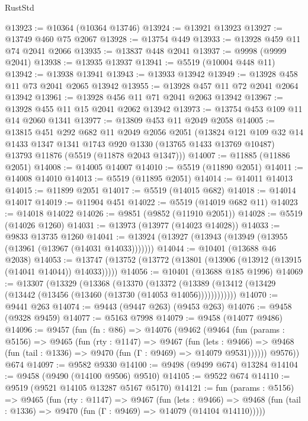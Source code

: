 \begin{lexlean}{RustStd}
\begin{coremodule}
@13923 := @10364 (@10364 @13746)
@13924 := @13921 @13923
@13927 := @13749 @460 @75 @2067
@13928 := @13754 @449
@13933 := @13928 @459 @11 @74 @2041 @2066
@13935 := @13837 @448 @2041
@13937 := @9998 (@9999 @2041)
@13938 := @13935 @13937
@13941 := @5519 (@10004 @448 @11)
@13942 := @13938 @13941
@13943 := @13933 @13942
@13949 := @13928 @458 @11 @73 @2041 @2065 @13942
@13955 := @13928 @457 @11 @72 @2041 @2064 @13942
@13961 := @13928 @456 @11 @71 @2041 @2063 @13942
@13967 := @13928 @455 @11 @15 @2041 @2062 @13942
@13973 := @13754 @453 @109 @11 @14 @2060 @1341
@13977 := @13809 @453 @11 @2049 @2058
@14005 := @13815
    @451
    @292
    @682
    @11
    @2049
    @2056
    @2051
    (@13824
      @121
      @109
      @32
      @14
      @1433
      @1347
      @1341
      @1743
      @920
      @1330
      (@13765 @1433 @13769 @10487)
      @13793
      @11876
      (@5519 (@11878 @2043 @1347)))
@14007 := @11885 (@11886 @2051)
@14008 := @14005 @14007
@14010 := @5519 (@11890 @2051)
@14011 := @14008 @14010
@14013 := @5519 (@11895 @2051)
@14014 := @14011 @14013
@14015 := @11899 @2051
@14017 := @5519 (@14015 @682)
@14018 := @14014 @14017
@14019 := @11904 @451
@14022 := @5519 (@14019 @682 @11)
@14023 := @14018 @14022
@14026 := @9851 (@9852 (@11910 @2051))
@14028 := @5519 (@14026 @1260)
@14031 := @13973 (@13977 (@14023 @14028))
@14033 := @9833 @13735 @1260
@14041 := @13924 (@13927 (@13943 (@13949 (@13955 (@13961 (@13967 (@14031 @14033)))))))
@14044 := @10401 (@13688 @46 @2038)
@14053 := @13747 (@13752 (@13772 (@13801 (@13906 (@13912 (@13915 (@14041 @14044)) @14033)))))
@14056 := @10401 (@13688 @185 @1996)
@14069 := @13307
    (@13329
      (@13368
        (@13370
          (@13372 (@13389 (@13412 (@13429 (@13442 (@13456 (@13460 (@13730 (@14053 @14056))))))))))))
@14070 := @9441 @263
@14074 := @9443 (@9447 @263) (@9453 @263)
@14076 := @9458 (@9328 @9459)
@14077 := @5163 @7998
@14079 := @9458 (@14077 @9486)
@14096 := @9457
    (fun (fn : @86) =>
    @14076
      (@9462
        (@9464
          (fun (params : @5156) =>
          @9465
            (fun (rty : @1147) =>
            @9467
              (fun (lets : @9466) =>
              @9468 (fun (tail : @1336) => @9470 (fun (Γ : @9469) => @14079 @9531))))))
        @9576))
    @674
@14097 := @9582 @9330
@14100 := @9498 (@9499 @674) @13284
@14104 := @9458 (@9490 (@14100 @9506) @9510)
@14105 := @9522 @674
@14110 := @9519 (@9521 @14105 @13287 @5167 @5170)
@14121 := fun (params : @5156) =>
  @9465
    (fun (rty : @1147) =>
    @9467
      (fun (lets : @9466) =>
      @9468 (fun (tail : @1336) => @9470 (fun (Γ : @9469) => @14079 (@14104 @14110)))))

\end{coremodule}
\end{lexlean}
